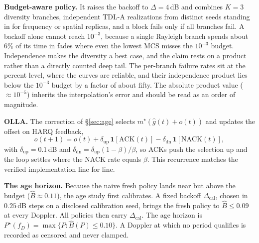 \documentclass[conference]{IEEEtran}
\begin{document}
\textbf{Budget-aware policy.} It raises the backoff to $\Delta=4$\,dB and
combines $K{=}3$ diversity branches, independent TDL-A realizations from distinct
seeds standing in for frequency or spatial replicas, and a block fails only if
all branches fail. A backoff alone cannot reach $10^{-3}$, because a single Rayleigh
branch spends about $6\%$ of its time in fades where even the lowest MCS misses
the $10^{-3}$ budget. Independence
makes the diversity a best case, and the claim rests on a product rather than a
directly counted deep tail. The per-branch failure rates sit at the percent
level, where the curves are reliable, and their independence product lies below
the $10^{-3}$ budget by a factor of about fifty. The absolute product value
($\approx 10^{-5}$) inherits the interpolation's error and should be read as an
order of magnitude.

\textbf{OLLA.} The correction of \S\ref{sec:age} selects
$m^\star(\hat{g}(t)+o(t))$ and updates the offset on HARQ feedback,
\begin{equation}
o(t{+}1)=o(t)+\delta_{\mathrm{up}}\,\mathbf{1}[\text{ACK}(t)]
-\delta_{\mathrm{dn}}\,\mathbf{1}[\text{NACK}(t)],
\label{eq:olla}
\end{equation}
with $\delta_{\mathrm{up}}=0.1$\,dB and
$\delta_{\mathrm{dn}}=\delta_{\mathrm{up}}(1-\beta)/\beta$, so ACKs push the
selection up and the loop settles where the NACK rate equals $\beta$. This
recurrence matches the verified implementation line for line.

\textbf{The age horizon.} Because the naive fresh policy lands near but above the
budget ($\widehat{B}\approx 0.11$), the age study first calibrates. A fixed
backoff $\Delta_{\mathrm{cal}}$, chosen in $0.25$\,dB steps on a disclosed
calibration seed, brings the fresh policy to $\widehat{B}\le 0.09$ at every
Doppler. All policies then carry $\Delta_{\mathrm{cal}}$. The age horizon is
$P^\star(f_D)=\max\{P:\widehat{B}(P)\le 0.10\}$. A Doppler at which no period
qualifies is recorded as censored and never clamped.
\end{document}
